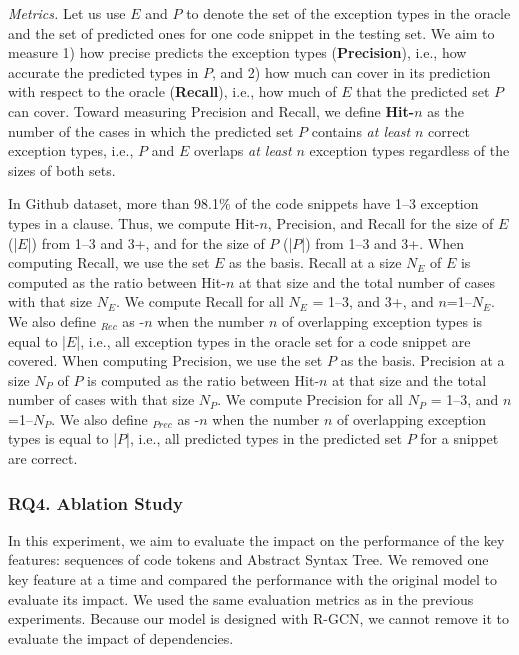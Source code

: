 {\em Metrics.} Let us use $E$ and $P$ to denote the set of the
exception types in the oracle and the set of predicted
ones for one code snippet in the testing set. We aim to measure 1) how
precise {\tool} predicts the exception types ({\bf Precision}), i.e.,
how accurate the predicted types in $P$, and 2) how much {\tool} can
cover in its prediction with respect to the oracle ({\bf Recall}),
i.e., how much of $E$ that the predicted set $P$ can cover. Toward
measuring Precision and Recall, we define {\bf Hit-$n$} as the number
of the cases in which the predicted set $P$ contains
{\em at least} $n$ correct exception types, i.e., $P$ and $E$ overlaps
{\em at least} $n$ exception types regardless of the sizes of both
sets.

In Github dataset, more than 98.1\% of the code snippets have 1--3
exception types in a  clause. Thus, we compute Hit-$n$,
Precision, and Recall for the size of $E$ (|$E$|) from 1--3 and 3+,
and for the size of $P$ (|$P$|) from 1--3 and 3+.
%
When computing Recall, we use the set $E$ as the basis. Recall at a
size $N_E$ of $E$ is computed as the ratio between Hit-$n$ at that
size and the total number of cases with that size $N_E$. We compute
Recall for all $N_E$ = 1--3, and 3+, and $n$=1--$N_E$. We also define
{\bf {}$_{Rec}$} as -$n$ when the number $n$ of
overlapping exception types is equal to |$E$|, i.e., all exception
types in the oracle set for a code snippet are covered.
%
When computing Precision, we use the set $P$ as the basis. Precision
at a size $N_P$ of $P$ is computed as the ratio between Hit-$n$ at
that size and the total number of cases with that size $N_P$. We
compute Precision for all $N_P$ = 1--3, and $n$=1--$N_P$. We also
define {\bf {}$_{Prec}$} as -$n$ when the number $n$
of overlapping exception types is equal to |$P$|, i.e., all predicted
types in the predicted set $P$ for a snippet are
correct.



\subsubsection{RQ4. Ablation Study}

In this experiment, we aim to evaluate the impact on the performance
of the key features: sequences of code tokens and Abstract Syntax Tree.
We removed one key feature at a time and compared the performance with
the original model to evaluate its impact. We used the same evaluation
metrics as in the previous experiments. Because our model is designed
with R-GCN, we cannot remove it to evaluate the impact of dependencies.

